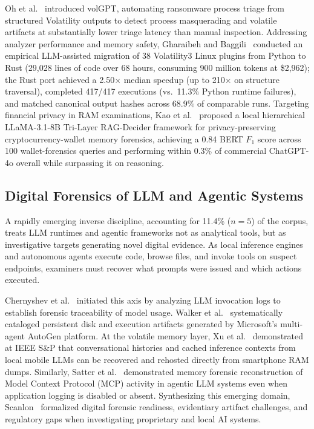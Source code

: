 Oh et al.~\cite{oh2024_volgpt} introduced volGPT, automating ransomware process triage from structured Volatility outputs to detect process masquerading and volatile artifacts at substantially lower triage latency than manual inspection. Addressing analyzer performance and memory safety, Gharaibeh and Baggili~\cite{gharaibeh2026_rusting} conducted an empirical LLM-assisted migration of 38 Volatility3 Linux plugins from Python to Rust (29,028 lines of code over 68 hours, consuming 900 million tokens at \$2,962); the Rust port achieved a 2.50$\times$ median speedup (up to 210$\times$ on structure traversal), completed 417/417 executions (vs.\ 11.3\% Python runtime failures), and matched canonical output hashes across 68.9\% of comparable runs. Targeting financial privacy in RAM examinations, Kao et al.~\cite{kao2026_a} proposed a local hierarchical LLaMA-3.1-8B Tri-Layer RAG-Decider framework for privacy-preserving cryptocurrency-wallet memory forensics, achieving a 0.84 BERT $F_1$ score across 100 wallet-forensics queries and performing within 0.3\% of commercial ChatGPT-4o overall while surpassing it on reasoning.

\subsection{Digital Forensics of LLM and Agentic Systems}
A rapidly emerging inverse discipline, accounting for 11.4\% ($n=5$) of the corpus, treats LLM runtimes and agentic frameworks not as analytical tools, but as investigative targets generating novel digital evidence. As local inference engines and autonomous agents execute code, browse files, and invoke tools on suspect endpoints, examiners must recover what prompts were issued and which actions executed.

Chernyshev et al.~\cite{chernyshev2023_towards} initiated this axis by analyzing LLM invocation logs to establish forensic traceability of model usage. Walker et al.~\cite{walker2024_forensic} systematically cataloged persistent disk and execution artifacts generated by Microsoft's multi-agent AutoGen platform. At the volatile memory layer, Xu et al.~\cite{xu2026_recovering} demonstrated at IEEE S\&P that conversational histories and cached inference contexts from local mobile LLMs can be recovered and rehosted directly from smartphone RAM dumps. Similarly, Satter et al.~\cite{satter2026_with} demonstrated memory forensic reconstruction of Model Context Protocol (MCP) activity in agentic LLM systems even when application logging is disabled or absent. Synthesizing this emerging domain, Scanlon~\cite{scanlon2026_investigation} formalized digital forensic readiness, evidentiary artifact challenges, and regulatory gaps when investigating proprietary and local AI systems.

